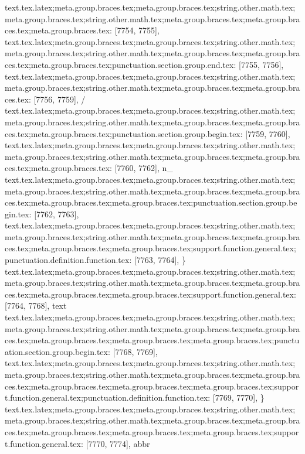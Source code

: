 {{{{{{{{{{{{{{{{{{{{{{{{{{{{{{{{{{{{{{{{{{{{{{{{{{{{{{{{{{{{{{{{{{{{{{{{{{{{{{{{{{{{{{{{{{{{{{{{{{{{{{{{{{{{{{{{{{{{{{{{{{{{{{{{{{{{{{{{{{{{{{{{{{{{{{{{{{{{{{{{{{{{{{{{{{{{{{{{{{{{{{{{{{{{{{{{{{{{{{{{{{{{{{{{{{{{{{{{{{{{{{{{{{text.tex.latex;meta.group.braces.tex;meta.group.braces.tex;string.other.math.tex;meta.group.braces.tex;string.other.math.tex;meta.group.braces.tex;meta.group.braces.tex;meta.group.braces.tex: [7754, 7755], { }
text.tex.latex;meta.group.braces.tex;meta.group.braces.tex;string.other.math.tex;meta.group.braces.tex;string.other.math.tex;meta.group.braces.tex;meta.group.braces.tex;meta.group.braces.tex;punctuation.section.group.end.tex: [7755, 7756], {}}
text.tex.latex;meta.group.braces.tex;meta.group.braces.tex;string.other.math.tex;meta.group.braces.tex;string.other.math.tex;meta.group.braces.tex;meta.group.braces.tex: [7756, 7759], { / }
text.tex.latex;meta.group.braces.tex;meta.group.braces.tex;string.other.math.tex;meta.group.braces.tex;string.other.math.tex;meta.group.braces.tex;meta.group.braces.tex;meta.group.braces.tex;punctuation.section.group.begin.tex: [7759, 7760], {{}
text.tex.latex;meta.group.braces.tex;meta.group.braces.tex;string.other.math.tex;meta.group.braces.tex;string.other.math.tex;meta.group.braces.tex;meta.group.braces.tex;meta.group.braces.tex: [7760, 7762], {n_}
text.tex.latex;meta.group.braces.tex;meta.group.braces.tex;string.other.math.tex;meta.group.braces.tex;string.other.math.tex;meta.group.braces.tex;meta.group.braces.tex;meta.group.braces.tex;meta.group.braces.tex;punctuation.section.group.begin.tex: [7762, 7763], {{}
text.tex.latex;meta.group.braces.tex;meta.group.braces.tex;string.other.math.tex;meta.group.braces.tex;string.other.math.tex;meta.group.braces.tex;meta.group.braces.tex;meta.group.braces.tex;meta.group.braces.tex;support.function.general.tex;punctuation.definition.function.tex: [7763, 7764], {\}
text.tex.latex;meta.group.braces.tex;meta.group.braces.tex;string.other.math.tex;meta.group.braces.tex;string.other.math.tex;meta.group.braces.tex;meta.group.braces.tex;meta.group.braces.tex;meta.group.braces.tex;support.function.general.tex: [7764, 7768], {text}
text.tex.latex;meta.group.braces.tex;meta.group.braces.tex;string.other.math.tex;meta.group.braces.tex;string.other.math.tex;meta.group.braces.tex;meta.group.braces.tex;meta.group.braces.tex;meta.group.braces.tex;meta.group.braces.tex;punctuation.section.group.begin.tex: [7768, 7769], {{}
text.tex.latex;meta.group.braces.tex;meta.group.braces.tex;string.other.math.tex;meta.group.braces.tex;string.other.math.tex;meta.group.braces.tex;meta.group.braces.tex;meta.group.braces.tex;meta.group.braces.tex;meta.group.braces.tex;support.function.general.tex;punctuation.definition.function.tex: [7769, 7770], {\}
text.tex.latex;meta.group.braces.tex;meta.group.braces.tex;string.other.math.tex;meta.group.braces.tex;string.other.math.tex;meta.group.braces.tex;meta.group.braces.tex;meta.group.braces.tex;meta.group.braces.tex;meta.group.braces.tex;support.function.general.tex: [7770, 7774], {abbr}
}}}}}}}}}}}}}}}}}}}}}}}}}}}}}}}}}}}}}}}}}}}}}}}}}}}}}}}}}}}}}}}}}}}}}}}}}}}}}}}}}}}}}}}}}}}}}}}}}}}}}}}}}}}}}}}}}}}}}}}}}}}}}}}}}}}}}}}}}}}}}}}}}}}}}}}}}}}}}}}}}}}}}}}}}}}}}}}}}}}}}}}}}}}}}}}}}}}}}}}}}}}}}}}}}}}}}}}}}}}}}}}}}}}}}}
